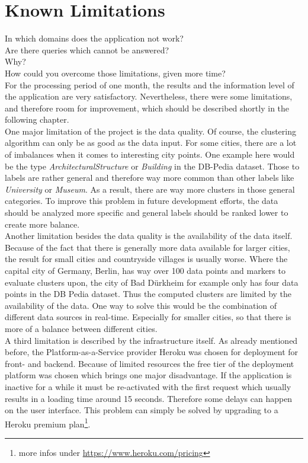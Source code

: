 \section{Known Limitations}
In which domains does the application not work? \\
Are there queries which cannot be answered? \\
Why? \\
How could you overcome those limitations, given more time?
\\ 

For the processing period of one month, the results and the information level of the application are very satisfactory. Nevertheless, there were some limitations, and therefore room for improvement, which should be described shortly in the following chapter.
\\

One major limitation of the project is the data quality. Of course, the clustering algorithm can only be as good as the data input. For some cities, there are a lot of imbalances when it comes to interesting city points. One example here would be the type \textit{ArchitecturalStructure} or \textit{Building} in the DB-Pedia dataset. Those to labels are rather general and therefore way more common than other labels like \textit{University} or \textit{Museum}. As a result, there are way more clusters in those general categories. To improve this problem in future development efforts, the data should be analyzed more specific and general labels should be ranked lower to create more balance.
\\

Another limitation besides the data quality is the availability of the data itself. Because of the fact that there is generally more data available for larger cities, the result for small cities and countryside villages is usually worse. Where the capital city of Germany, Berlin, has way over 100 data points and markers to evaluate clusters upon, the city of Bad D\"urkheim for example only has four data points in the DB Pedia dataset. Thus the computed clusters are limited by the availability of the data. One way to solve this would be the combination of different data sources in real-time. Especially for smaller cities, so that there is more of a balance between different cities. 
\\

A third limitation is described by the infrastructure itself. As already mentioned before, the Platform-as-a-Service provider Heroku was chosen for deployment for front- and backend. Because of limited resources the free tier of the deployment platform was chosen which brings one major disadvantage. If the application is inactive for a while it must be re-activated with the first request which usually results in a loading time around 15 seconds. Therefore some delays can happen on the user interface. This problem can simply be solved by upgrading to a Heroku premium plan\footnote{more infos under \url{https://www.heroku.com/pricing}}.
